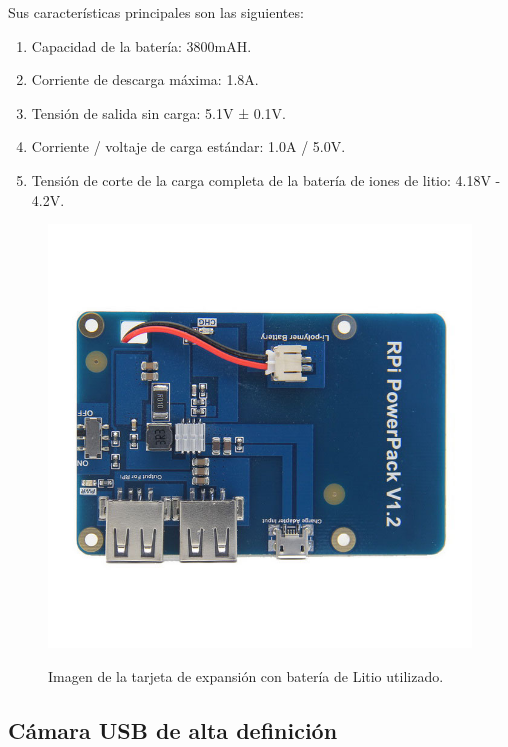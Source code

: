 Sus características principales son las siguientes:

\begin{enumerate}
 \item Capacidad de la batería: 3800mAH.
 \item Corriente de descarga máxima: 1.8A.
 \item Tensión de salida sin carga: 5.1V ± 0.1V.
 \item Corriente / voltaje de carga estándar: 1.0A / 5.0V.
 \item Tensión de corte de la carga completa de la batería de iones de litio: 4.18V - 4.2V.
\end{enumerate}


\begin{figure}[H]
  \begin{center}
    \includegraphics[scale=0.3]{imagenes/robot/modulo-alimentacion.jpg}\\
    \caption{Imagen de la tarjeta de expansión con batería de Litio utilizado.}
  \end{center}
\end{figure}

\subsection{ Cámara USB de alta definición }

